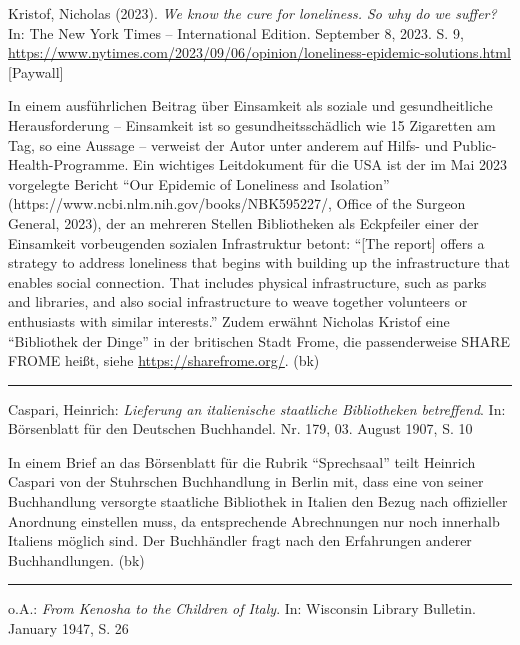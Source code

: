 \documentclass[a4paper,
fontsize=11pt,
oneside,
numbers=noperiodatend,
parskip=half-,
bibliography=totoc,
final
]{scrartcl}
\begin{document}
Kristof, Nicholas (2023). \emph{We know the cure for loneliness. So why
do we suffer?} In: The New York Times -- International Edition.
September 8, 2023. S. 9,
\url{https://www.nytimes.com/2023/09/06/opinion/loneliness-epidemic-solutions.html}
{[}Paywall{]}

In einem ausführlichen Beitrag über Einsamkeit als soziale und
gesundheitliche Herausforderung -- Einsamkeit ist so
gesundheitsschädlich wie 15 Zigaretten am Tag, so eine Aussage --
verweist der Autor unter anderem auf Hilfs- und Public-Health-Programme.
Ein wichtiges Leitdokument für die USA ist der im Mai 2023 vorgelegte
Bericht \enquote{Our Epidemic of Loneliness and Isolation} (https://www.ncbi.nlm.nih.gov/books/NBK595227/, Office of
the Surgeon General, 2023), der an mehreren Stellen
Bibliotheken als Eckpfeiler einer der Einsamkeit vorbeugenden sozialen
Infrastruktur betont: \enquote{{[}The report{]} offers a strategy to
address loneliness that begins with building up the infrastructure that
enables social connection. That includes physical infrastructure, such
as parks and libraries, and also social infrastructure to weave together
volunteers or enthusiasts with similar interests.} Zudem erwähnt
Nicholas Kristof eine \enquote{Bibliothek der Dinge} in der britischen
Stadt Frome, die passenderweise SHARE FROME heißt, siehe
\href{https://sharefrome.org/}{\uline{https://sharefrome.org/}}. (bk)

\begin{center}\rule{0.5\linewidth}{0.5pt}\end{center}

Caspari, Heinrich: \emph{Lieferung an italienische staatliche
Bibliotheken betreffend}. In: Börsenblatt für den Deutschen Buchhandel.
Nr. 179, 03. August 1907, S. 10

In einem Brief an das Börsenblatt für die Rubrik \enquote{Sprechsaal}
teilt Heinrich Caspari von der Stuhrschen Buchhandlung in Berlin mit,
dass eine von seiner Buchhandlung versorgte staatliche Bibliothek in
Italien den Bezug nach offizieller Anordnung einstellen muss, da
entsprechende Abrechnungen nur noch innerhalb Italiens möglich sind. Der
Buchhändler fragt nach den Erfahrungen anderer Buchhandlungen. (bk)

\begin{center}\rule{0.5\linewidth}{0.5pt}\end{center}

o.A.: \emph{From Kenosha to the Children of Italy}. In: Wisconsin
Library Bulletin. January 1947, S. 26
\end{document}

